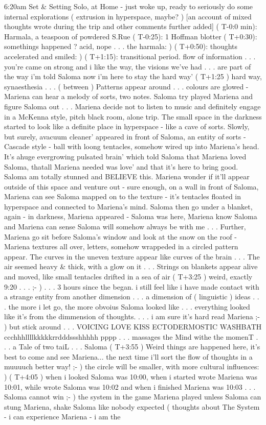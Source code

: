 \documentclass[12pt]{book}
\begin{document}
6:20am Set \& Setting Solo, at Home - just woke up, ready to seriously do some internal explorations ( extrusion in hyperspace, maybe? ) [an account of mixed thoughts wrote during the trip and other comments further added] ( T-0:0 min): Harmala, a teaspoon of powdered S.Rue ( T-0:25): 1 Hoffman blotter ( T+0:30): somethings happened ? acid, nope . . .  the harmala: ) ( T+0:50): thoughts accelerated and smiled: ) ( T+1:15): transitional period. flow of information  . . . you're came on strong and i like the way, the visions we've had  . . .  are part of the way i'm told Saloma now i'm here to stay the hard way' ( T+1:25 ) hard way, synaesthesia  . . .  ( between ) Patterns appear around  . . .  colours are glowed - Mariena can hear a melody of sorts, two notes. Saloma try played Mariena and figure Saloma out . . .  Mariena decide not to listen to music and definitely engage in a McKenna style, pitch black room, alone trip. The small space in the darkness started to look like a definite place in hyperspace - like a cave of sorts. Slowly, but surely, avacuum cleaner' appeared in front of Saloma, an entity of sorts - Cascade style - ball with loong tentacles, somehow wired up into Mariena's head. It's ahuge evergrowing pulsated brain' which told Saloma that Mariena loved Saloma, thatall Mariena needed was love' and that it's here to bring good. Saloma am totally stunned and BELIEVE this. Mariena wonder if it'll appear outside of this space and venture out - sure enough, on a wall in front of Saloma, Mariena can see Saloma mapped on to the texture - it's tentacles floated in hyperspace and connected to Mariena's mind. Saloma then go under a blanket, again - in darkness, Mariena appeared - Saloma was here, Mariena know Saloma and Mariena can sense Saloma will somehow always be with me . . .  Further, Mariena go sit before Saloma's window and look at the snow on the roof - Mariena textures all over, letters, somehow wrappeded in a circled pattern appear. The curves in the uneven texture appear like curves of the brain . . .  The air seemed heavy \& thick, with a glow on it . . .  Strings on blankets appear alive and moved, like small tentacles drifted in a sea of air ( T+3:25 ) weird, exactly 9:20  . . .  ;- )  . . .  3 hours since the began. i still feel like i have made contact with a strange entity from another dimension  . . .  a dimension of ( linguistic ) ideas  . . .  the more i let go, the more obvoius Saloma looked like  . . .  everything looked like it's from the dimmension of thoughts.  . . .  i am sure it's hard read Mariena ;- ) but stick around  . . .  VOICING LOVE KISS ECTODERMOSTIC WASHBATH ccchhhllllkkkkkrrdddssshhhhh pppp  . . .  massages the Mind withe the momenT  . . .  a Tale of two taiL  . . .  Saloma ( T+3:55 ) Weird things are happened here, it's best to come and see Mariena... the next time i'll sort the flow of thoughts in a muuuuch better way! ;- ) the circle will be smaller, with more cultural influences: ) ( T+4:05 ) when i looked Saloma was 10:00, when i started wrote Mariena was 10:01, while wrote Saloma was 10:02 and when i finished Mariena was 10:03  . . .  Saloma cannot win ;- ) the system in the game Mariena played unless Saloma can stung Mariena, shake Saloma like nobody expected ( thoughts about The System - i can experience Mariena - i am the 
\end{document}
